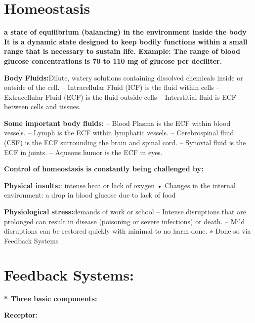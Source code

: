 \documentclass[12pt]{article}
\begin{document}
\section{Homeostasis}
\textbf{a state of equilibrium (balancing) in the environment inside the body It is a dynamic state designed to keep bodily functions within a small range that is necessary to sustain life.
Example: The range of blood glucose concentrations is 70 to 110 mg of glucose per deciliter.}
\item\textbf{Body Fluids:}Dilute, watery solutions containing dissolved chemicals inside or outside of
the cell.
\newline– Intracellular Fluid (ICF) is the fluid within cells
\newline– Extracellular Fluid (ECF) is the fluid outside cells
\newline– Interstitial fluid is ECF between cells and tissues.
\item\textbf{Some important body fluids:}
\newline– Blood Plasma is the ECF within blood vessels.
\newline– Lymph is the ECF within lymphatic vessels.
\newline– Cerebrospinal fluid (CSF) is the ECF surrounding the brain and
spinal cord.
\newline– Synovial fluid is the ECF in joints.
\newline– Aqueous humor is the ECF in eyes.

\textbf{Control of homeostasis is constantly being challenged by:
}
\item\textbf{Physical insults:}: intense heat or lack of oxygen
\newline• Changes in the internal environment: a drop in blood glucose due to lack
of food
\item\textbf{Physiological stress:}demands of work or school
\newline– Intense disruptions that are prolonged can result in disease (poisoning
or severe infections) or death.\newline
– Mild disruptions can be restored quickly with minimal to no harm
done.
\newline∗ Done so via Feedback Systems

\section{Feedback Systems:}
\item\textbf{* Three basic components:
}
\item\textbf{Receptor:}
\end{document}
